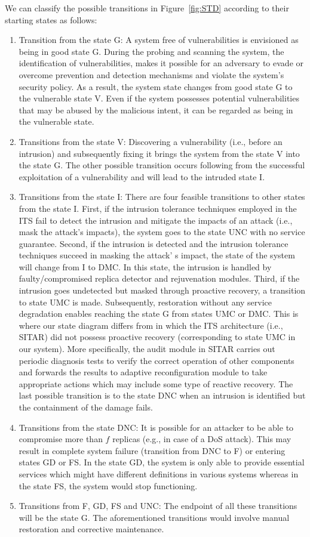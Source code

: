 \documentclass[preprint,number,12pt]{elsarticle}
\begin{document}
We can classify the possible transitions in Figure~\ref{fig:STD} according to their starting states as follows:
\begin {enumerate}
\item Transition from the state G: A system free of vulnerabilities is envisioned as being in good state G. During the probing and scanning the system, the identification of vulnerabilities, makes it possible for an adversary to evade or overcome prevention and detection mechanisms and violate the system's security policy. As a result, the system state changes from good state G to the vulnerable state V. Even if the system possesses potential vulnerabilities that may be abused by the malicious intent, it can be regarded as being in the vulnerable state.
\item Transitions from the state V: Discovering a vulnerability (i.e., before an intrusion) and subsequently fixing it brings the system from the state V into the state G. The other possible transition occurs following from the successful exploitation of a vulnerability and will lead to the intruded state I.
\item Transitions from the state I: There are four feasible transitions to other states from the state I. First, if the intrusion tolerance techniques employed in the ITS fail to detect the intrusion and mitigate the impacts of an attack (i.e., mask the attack’s impacts), the system goes to the state UNC with no service guarantee. Second, if the intrusion is detected and the intrusion tolerance techniques succeed in masking the attack' s impact, the state of the system will change from I to DMC. In this state, the intrusion is handled by faulty/compromised replica detector and rejuvenation modules. Third, if the intrusion goes undetected but masked through proactive recovery, a transition to state UMC is made. Subsequently, restoration without any service degradation enables reaching the state G from states UMC or DMC. This is where our state diagram differs from\citep{Madan2004167} in which the ITS architecture (i.e., SITAR) did not possess proactive recovery (corresponding to state UMC in our system). More specifically, the audit module in SITAR carries out periodic diagnosis tests to verify the correct operation of other components and forwards the results to adaptive reconfiguration module to take appropriate actions\citep{Wang2003a} which may include some type of reactive recovery. The last possible transition is to the state DNC when an intrusion is identified but the containment of the damage fails.
\item Transitions from the state DNC: It is possible for an attacker to be able to compromise more than $f$ replicas (e.g., in case of a DoS attack). This may result in complete system failure (transition from DNC to F) or entering states GD or FS. In the state GD, the system is only able to provide essential services which might have different definitions in various systems whereas in the state FS, the system would stop functioning.
\item Transitions from F, GD, FS and UNC: The endpoint of all these transitions will be the state G. The aforementioned transitions would involve manual restoration and corrective maintenance.
\end{enumerate}
\end{document}
